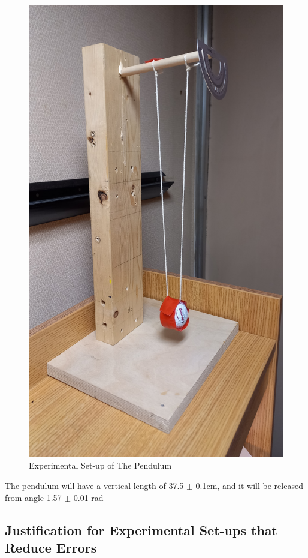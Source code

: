 \documentclass{article}
\begin{document}
\begin{figure}[!htb]
	\centering
	\includegraphics[scale=0.05, angle = 270]{experimental_setup_pendulum.jpg}
	\caption{Experimental Set-up of The Pendulum}
	\label{fig_angle}
\end{figure}

\noindent The pendulum will have a vertical length of 37.5 $\pm$ 0.1cm, and it will be released from angle 1.57 $\pm$ 0.01 rad

\subsection{Justification for Experimental Set-ups that Reduce Errors}
\end{document}
